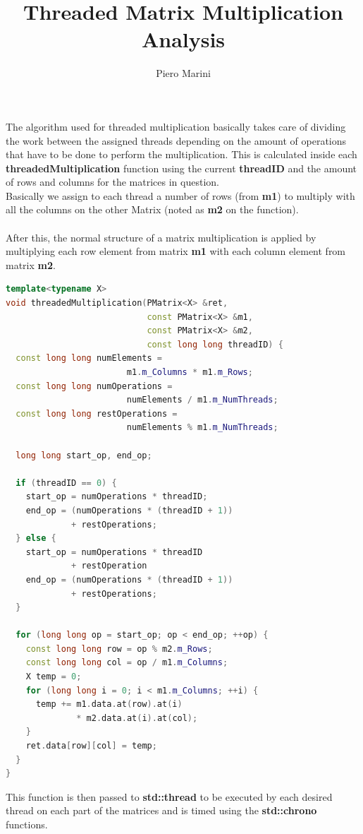 \documentclass{article}
\author{Piero Marini}
\title{Threaded Matrix Multiplication Analysis}
\begin{document}
\maketitle

The algorithm used for threaded multiplication basically takes care of dividing the work between the assigned threads depending on the amount of operations that have to be done to perform the multiplication. This is calculated inside each \textbf{threadedMultiplication} function using the current \textbf{threadID} and the amount of rows and columns for the matrices in question.\\
Basically we assign to each thread a number of rows (from \textbf{m1}) to multiply with all the columns on the other Matrix (noted as \textbf{m2} on the function).\\\\
After this, the normal structure of a matrix multiplication is applied by multiplying each row element from matrix \textbf{m1} with each column element from matrix \textbf{m2}.

\begin{lstlisting}[language=C++, caption={C++ Threaded Multiplication Function}]
template<typename X>
void threadedMultiplication(PMatrix<X> &ret,
							const PMatrix<X> &m1, 
							const PMatrix<X> &m2,
							const long long threadID) {
  const long long numElements = 
						m1.m_Columns * m1.m_Rows;
  const long long numOperations = 
						numElements / m1.m_NumThreads;
  const long long restOperations = 
						numElements % m1.m_NumThreads;

  long long start_op, end_op;

  if (threadID == 0) {
	start_op = numOperations * threadID;
	end_op = (numOperations * (threadID + 1)) 
			 + restOperations;
  } else {
	start_op = numOperations * threadID
			 + restOperation
	end_op = (numOperations * (threadID + 1)) 
			 + restOperations;
  }

  for (long long op = start_op; op < end_op; ++op) {
	const long long row = op % m2.m_Rows;
	const long long col = op / m1.m_Columns;
	X temp = 0;
	for (long long i = 0; i < m1.m_Columns; ++i) {
	  temp += m1.data.at(row).at(i)
			  * m2.data.at(i).at(col);
	}
	ret.data[row][col] = temp;
  }
}
\end{lstlisting}
\pagebreak

This function is then passed to \textbf{std::thread} to be executed by each desired thread on each part of the matrices and is timed using the \textbf{std::chrono} functions.
\end{document}
